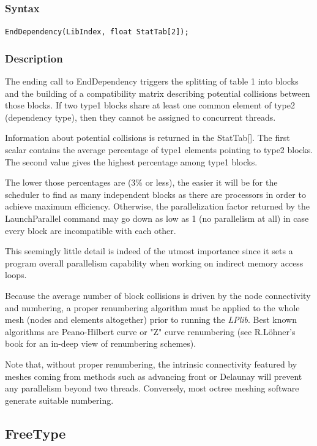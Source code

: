 \documentclass[a4paper,12pt]{article}
\begin{document}
\subsubsection*{Syntax}
\tt{EndDependency(LibIndex, float StatTab[2]);}
\normalfont

\subsubsection*{Description}
\label{collisions}

The ending call to EndDependency triggers the splitting of table 1 into blocks and the building of a compatibility matrix describing potential collisions between those blocks. If two type1 blocks share at least one common element of type2 (dependency type), then they cannot be assigned to concurrent threads.

Information about potential collisions is returned in the StatTab[]. The first scalar contains the average percentage of type1 elements pointing to type2 blocks. The second value gives the highest percentage among type1 blocks.

The lower those percentages are (3\% or less), the easier it will be for the scheduler to find as many independent blocks as there are processors in order to achieve maximum efficiency. Otherwise, the parallelization factor returned by the LaunchParallel command may go down as low as 1 (no parallelism at all) in case every block are incompatible with each other.

This seemingly little detail is indeed of the utmost importance since it sets a program overall parallelism capability when working on indirect memory access loops.

Because the average number of block collisions is driven by the node connectivity and numbering, a proper renumbering algorithm must be applied to the whole mesh (nodes and elements altogether) prior to running the \emph{LPlib}. Best known algorithms are Peano-Hilbert curve or "Z" curve renumbering (see R.Löhner's book \cite {lohner} for an in-deep view of renumbering schemes).

Note that, without proper renumbering, the intrinsic connectivity featured by meshes coming from methods such as advancing front or Delaunay will prevent any parallelism beyond two threads. Conversely, most octree meshing software generate suitable numbering.


\subsection{FreeType}
\end{document}
